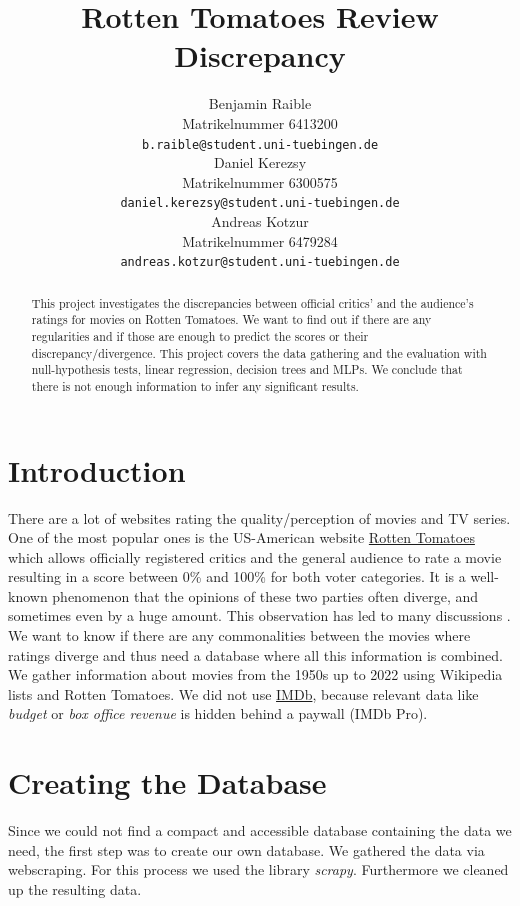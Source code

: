 \documentclass{article}
\title{Rotten Tomatoes Review Discrepancy}
\author{%
  Benjamin Raible\\
  Matrikelnummer 6413200\\
  \texttt{b.raible@student.uni-tuebingen.de} \\
  \And
  Daniel Kerezsy\\
  Matrikelnummer 6300575\\
  \texttt{daniel.kerezsy@student.uni-tuebingen.de} \\
  \And
  Andreas Kotzur\\
  Matrikelnummer 6479284\\
  \texttt{andreas.kotzur@student.uni-tuebingen.de} \\
}
\begin{document}
\maketitle
\begin{abstract}
    This project investigates the discrepancies between official critics' and the audience's ratings for movies on Rotten Tomatoes. We want to find out if there are any regularities and if those are enough to predict the scores or their discrepancy/divergence. This project covers the data gathering and the evaluation with null-hypothesis tests, linear regression, decision trees and MLPs. We conclude that there is not enough information to infer any significant results.
\end{abstract}

\section{Introduction}
    There are a lot of websites rating the quality/perception of movies and TV series. One of the most popular ones is the US-American website \href{https://www.rottentomatoes.com}{Rotten Tomatoes} \cite{rotten_about} which allows officially registered critics and the general audience to rate a movie resulting in a score between 0\% and 100\% for both voter categories. It is a well-known phenomenon that the opinions of these two parties often diverge, and sometimes even by a huge amount. This observation has led to many discussions \cite{looper_divides}\cite{reddit_divide_1}\cite{reddit_divide_2}.\\
    We want to know if there are any commonalities between the movies where ratings diverge and thus need a database where all this information is combined.  
    We gather information about movies from the 1950s up to 2022 using Wikipedia lists and Rotten Tomatoes. We did not use \href{https://www.imdb.com/}{IMDb}, because relevant data like \textit{budget} or \textit{box office revenue} is hidden behind a paywall (IMDb Pro).

\section{Creating the Database}
    Since we could not find a compact and accessible database containing the data we need, the first step was to create our own database. We gathered the data via webscraping. For this process we used the library \textit{scrapy}. Furthermore we cleaned up the resulting data.\\
\end{document}
